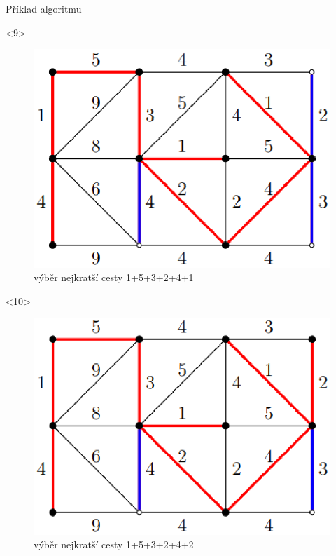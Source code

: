 \documentclass[pdf]{beamer}
\begin{document}
\begin{centering}
\begin{frame}{Příklad algoritmu}
    \begin{onlyenv}<9>
        \begin{figure}[h!]
        \includegraphics[scale=0.5]{obr9.eps}
        \caption{\label{fig:obr9}výběr nejkratší cesty 1+5+3+2+4+1}
        \end{figure}
    \end{onlyenv}
    
    \begin{onlyenv}<10>
        \begin{figure}[h!]
        \includegraphics[scale=0.5]{obr10.eps}
        \caption{\label{fig:obr10}výběr nejkratší cesty 1+5+3+2+4+2}
        \end{figure}
    \end{onlyenv}
    

\end{frame}
\end{centering}
\end{document}
